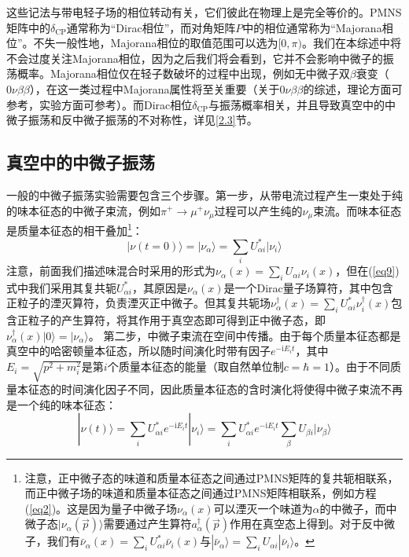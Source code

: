 \documentclass{article}
\newcommand{\ii}{\mathrm{i}}
\begin{document}
	这些记法与带电轻子场的相位转动有关，它们彼此在物理上是完全等价的。PMNS矩阵中的$\delta_\mathrm{CP}$通常称为“Dirac相位”，而对角矩阵$P$中的相位通常称为“Majorana相位”。不失一般性地，Majorana相位的取值范围可以选为$[0,\pi)$。我们在本综述中将不会过度关注Majorana相位，因为之后我们将会看到，它并不会影响中微子的振荡概率。Majorana相位仅在轻子数破坏的过程中出现，例如无中微子双$\beta$衰变（$0\nu\beta\beta$），在这一类过程中Majorana属性将至关重要（关于$0\nu\beta\beta$的综述，理论方面可参考\cite{vergados2012theory}\cite{dell2016neutrinoless}，实验方面可参考\cite{cremonesi2018neutrino}）。而Dirac相位$\delta_\mathrm{CP}$与振荡概率相关，并且导致真空中的中微子振荡和反中微子振荡的不对称性，详见\ref{2.3}节。
	\subsection{真空中的中微子振荡\label{2.2}}
	一般的中微子振荡实验需要包含三个步骤。第一步，从带电流过程产生一束处于纯的味本征态的中微子束流，例如$\pi^+\to\mu^+\nu_\mu$过程可以产生纯的$\nu_\mu$束流。而味本征态是质量本征态的相干叠加\footnote{注意，正中微子态的味道和质量本征态之间通过PMNS矩阵的复共轭相联系，而正中微子场的味道和质量本征态之间通过PMNS矩阵相联系，例如方程(\ref{eq2})。这是因为量子中微子场$\nu_\alpha(x)$可以湮灭一个味道为$\alpha$的中微子，而中微子态$|\nu_\alpha(\vec{p})\rangle$需要通过产生算符$a_\alpha^\dagger(\vec{p})$作用在真空态上得到。对于反中微子，我们有$\bar{\nu}_\alpha(x)=\sum_i U_{\alpha i}^*\bar{\nu}_i(x)$与$|\bar{\nu}_\alpha\rangle=\sum_i U_{\alpha i}|\bar{\nu}_i\rangle$。}：
	\begin{equation}
		|\nu(t=0)\rangle=|\nu_\alpha\rangle=\sum_i U_{\alpha i}^*|\nu_i\rangle
		\label{eq9}
	\end{equation}
	注意，前面我们描述味混合时采用的形式为$\nu_{\alpha}(x)=\sum_iU_{\alpha i}\nu_{i}(x)$，但在(\ref{eq9})式中我们采用其复共轭$U_{\alpha i}^*$，其原因是$\nu_\alpha(x)$是一个Dirac量子场算符，其中包含正粒子的湮灭算符，负责湮灭正中微子。但其复共轭场$\nu_\alpha^\dagger(x)=\sum_i U_{\alpha i}^*\nu_i^\dagger(x)$包含正粒子的产生算符，将其作用于真空态即可得到正中微子态，即$\nu_\alpha^\dagger(x)|0\rangle=|\nu_\alpha\rangle$。
	第二步，中微子束流在空间中传播。由于每个质量本征态都是真空中的哈密顿量本征态，所以随时间演化时带有因子$e^{-\ii E_it}$，其中$E_i=\sqrt{p^2+m_i^2}$是第$i$个质量本征态的能量（取自然单位制$c=\hbar=1$）。由于不同质量本征态的时间演化因子不同，因此质量本征态的含时演化将使得中微子束流不再是一个纯的味本征态：
	\begin{equation}
		|\nu(t)\rangle=\sum_{i} U_{\alpha i}^*e^{-\ii E_it}|\nu_i\rangle=\sum_iU_{\alpha i}^*e^{-\ii E_it}\sum_\beta U_{\beta i}|\nu_\beta\rangle
	\end{equation}
\end{document}
